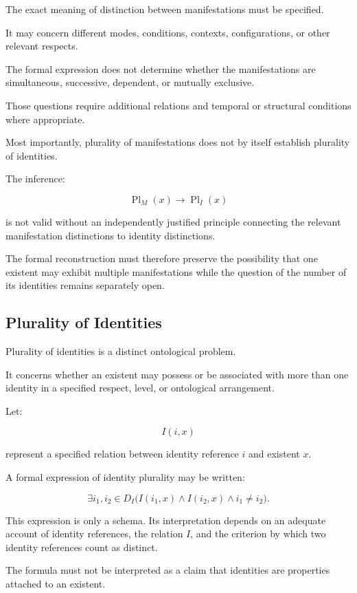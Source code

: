 The exact meaning of distinction
between manifestations must be
specified.

It may concern different modes,
conditions, contexts, configurations,
or other relevant respects.

The formal expression does not
determine whether the manifestations
are simultaneous, successive,
dependent, or mutually exclusive.

Those questions require additional
relations and temporal or structural
conditions where appropriate.

Most importantly, plurality of
manifestations does not by itself
establish plurality of identities.

The inference:

\[
    \operatorname{Pl}_{M}(x)
    \rightarrow
    \operatorname{Pl}_{I}(x)
\]

is not valid without an independently
justified principle connecting the
relevant manifestation distinctions
to identity distinctions.

The formal reconstruction must
therefore preserve the possibility
that one existent may exhibit
multiple manifestations while the
question of the number of its
identities remains separately open.

\subsection{Plurality of Identities}

Plurality of identities is a distinct
ontological problem.

It concerns whether an existent may
possess or be associated with more
than one identity in a specified
respect, level, or ontological
arrangement.

Let:

\[
    I(i,x)
\]

represent a specified relation
between identity reference \(i\)
and existent \(x\).

A formal expression of identity
plurality may be written:

\[
    \exists i_1,i_2 \in D_I
    \bigl(
        I(i_1,x)
        \land
        I(i_2,x)
        \land
        i_1 \neq i_2
    \bigr).
\]

This expression is only a schema.
Its interpretation depends on an
adequate account of identity references,
the relation \(I\), and the criterion
by which two identity references
count as distinct.

The formula must not be interpreted
as a claim that identities are
properties attached to an existent.

